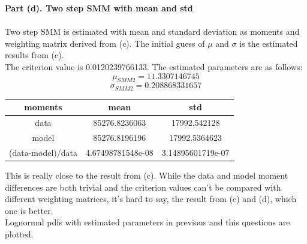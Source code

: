 \documentclass[letterpaper,12pt]{article}
\theoremstyle{definition}
\begin{document}
\clearpage

\noindent\textbf{Part (d). Two step SMM with mean and std} \\
\\
Two step SMM is estimated with mean and standard deviation as moments and weighting matrix derived from (c). The initial guess of $\mu$ and $\sigma$ is the estimated results from (c). \\
The criterion value is 0.0120239766133. The estimated parameters are as follows:
\[\mu_{SMM2}= 11.3307146745\]
\[\sigma_{SMM2}= 0.208868331657\]

\begin{center}
\begin{tabular}{ c|c|c }
 moments & mean & std \\
 \hline
 data & 85276.8236063 & 17992.542128 \\
 model & 85276.8196196 & 17992.5364623 \\
 (data-model)/data & 4.67498781548e-08 & 3.14895601719e-07
\end{tabular}
\end{center}
This is really close to the result from (c). While the data and model moment differences are both trivial and the criterion values can't be compared with different weighting matrices, it's hard to say, the result from (c) and (d), which one is better.
\\

Lognormal pdfs with estimated parameters in previous and this questions are plotted. \\

\begin{figure}[htb]\centering\captionsetup{width=6.0in}
  \caption{\textbf{}}
\end{figure} \\
\end{document}
